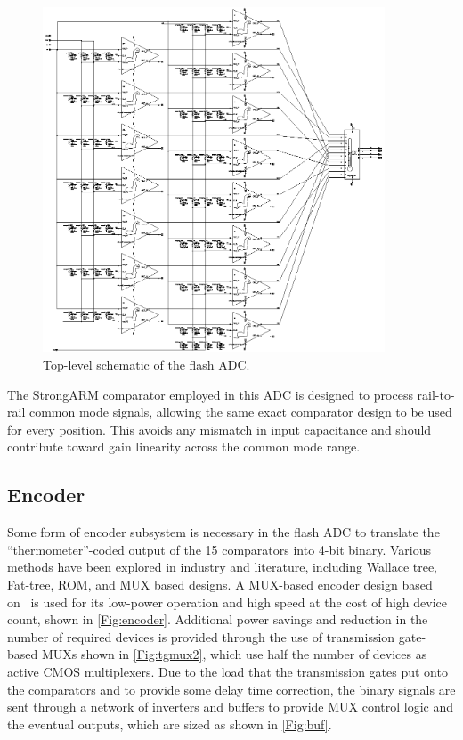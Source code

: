 \documentclass[11pt,letterpaper]{article}
\begin{document}
 \begin{figure}[htbp!]
		\centering
		\includegraphics[width=4in]{flash.eps}
		\caption{Top-level schematic of the flash ADC.}\label{Fig:flash}
	\end{figure}

The StrongARM comparator employed in this ADC is designed to process rail-to-rail common mode signals, allowing the same exact comparator design to be used for every position. This avoids any mismatch in input capacitance and should contribute toward gain linearity across the common mode range.

\subsection{Encoder}

Some form of encoder subsystem is necessary in the flash ADC to translate the ``thermometer''-coded output of the 15 comparators into 4-bit binary. Various methods have been explored in industry and literature, including Wallace tree, Fat-tree, ROM, and MUX based designs. A MUX-based encoder design based on~\cite{Lee2013} is used for its low-power operation and high speed at the cost of high device count, shown in \cref{Fig:encoder}. Additional power savings and reduction in the number of required devices is provided through the use of transmission gate-based MUXs shown in \cref{Fig:tgmux2}, which use half the number of devices as active CMOS multiplexers. Due to the load that the transmission gates put onto the comparators and to provide some delay time correction, the binary signals are sent through a network of inverters and buffers to provide MUX control logic and the eventual outputs, which are sized as shown in \cref{Fig:buf}.
\end{document}

